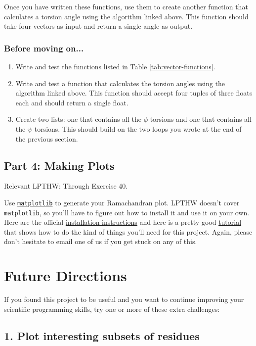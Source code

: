 \documentclass{article}
\newcommand{\bbphi}{\ensuremath{\phi}}
\newcommand{\bbpsi}{\ensuremath{\psi}}
\newcommand{\module}[2]{\href{#2}{\texttt{#1}}}
\newenvironment{lpthw}
{Relevant LPTHW:}
{}
\newenvironment{problems}
{\subsubsection{Before moving on...} \begin{enumerate}}
{\end{enumerate}}
\begin{document}
Once you have written these functions, use them to create another function that 
calculates a torsion angle using the algorithm linked above.  This function 
should take four vectors as input and return a single angle as output.  

\begin{problems}
 \item Write and test the functions listed in Table \ref{tab:vector-functions}.
 \item Write and test a function that calculates the torsion angles using the 
  algorithm linked above.  This function should accept four tuples of three 
  floats each and should return a single float.
 \item Create two lists: one that contains all the \bbphi{} torsions and one 
  that contains all the \bbpsi{} torsions.  This should build on the two loops 
  you wrote at the end of the previous section.
\end{problems}

\subsection{Part 4: Making Plots}

\begin{lpthw}
Through Exercise 40.
\end{lpthw}

Use \module{matplotlib}{http://matplotlib.org/users/pyplot_tutorial.html} to 
generate your Ramachandran plot.  LPTHW doesn't cover \texttt{matplotlib}, so 
you'll have to figure out how to install it and use it on your own.  Here are 
the official \href{http://matplotlib.org/users/installing.html} {installation 
instructions} and here is a pretty good
\href{http://matplotlib.org/users/pyplot_tutorial.html}{tutorial} that shows 
how to do the kind of things you'll need for this project.  Again, please don't 
hesitate to email one of us if you get stuck on any of this.

\section{Future Directions}

If you found this project to be useful and you want to continue improving your 
scientific programming skills, try one or more of these extra challenges:

\subsection{1. Plot interesting subsets of residues}
\end{document}
